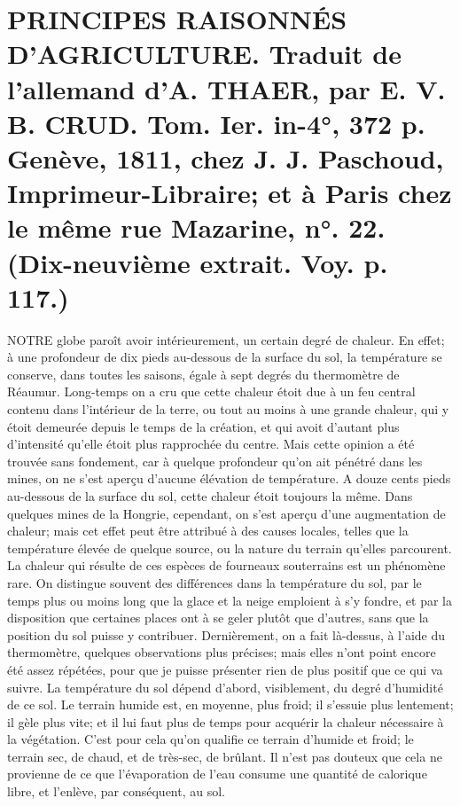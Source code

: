 \setcounter{page}{183}
\section{PRINCIPES RAISONNÉS D'AGRICULTURE. Traduit de l'allemand d'A. THAER, par E. V. B. CRUD. Tom. Ier. in-4°, 372 p. Genève, 1811, chez J. J. Paschoud, Imprimeur-Libraire; et à Paris chez le même rue Mazarine, n°. 22. \large{(Dix-neuvième extrait. Voy. p. 117.)}}
NOTRE globe paroît avoir intérieurement, un certain degré de chaleur. En effet; à une profondeur de dix pieds au-dessous de la surface du sol, la température se conserve, dans toutes les saisons, égale à sept degrés du thermomètre de Réaumur. Long-temps on a cru que cette chaleur étoit due à un feu central contenu dans l'intérieur de la terre, ou tout au moins à une grande chaleur, qui y étoit demeurée depuis le temps de la création, et qui avoit d'autant plus d'intensité qu'elle étoit plus rapprochée du centre. Mais cette opinion a été trouvée sans fondement, car à quelque profondeur qu'on ait pénétré dans les mines, on ne s'est aperçu d'aucune élévation de température. A douze cents pieds au-dessous de la\setcounter{page}{184} surface du sol, cette chaleur étoit toujours la même. Dans quelques mines de la Hongrie, cependant, on s'est aperçu d'une augmentation de chaleur; mais cet effet peut être attribué à des causes locales, telles que la température élevée de quelque source, ou la nature du terrain qu'elles parcourent. La chaleur qui résulte de ces espèces de fourneaux souterrains est un phénomène rare.
On distingue souvent des différences dans la température du sol, par le temps plus ou moins long que la glace et la neige emploient à s'y fondre, et par la disposition que certaines places ont à se geler plutôt que d'autres, sans que la position du sol puisse y contribuer.
Dernièrement, on a fait là-dessus, à l'aide du thermomètre, quelques observations plus précises; mais elles n'ont point encore été assez répétées, pour que je puisse présenter rien de plus positif que ce qui va suivre.
La température du sol dépend d'abord, visiblement, du degré d'humidité de ce sol. Le terrain humide est, en moyenne, plus froid; il s'essuie plus lentement; il gèle plus vite; et il lui faut plus de temps pour acquérir la chaleur nécessaire à la végétation.\setcounter{page}{185} C'est pour cela qu'on qualifie ce terrain d'humide et froid; le terrain sec, de chaud, et de très-sec, de brûlant. Il n'est pas douteux que cela ne provienne de ce que l'évaporation de l'eau consume une quantité de calorique libre, et l'enlève, par conséquent, au sol.
